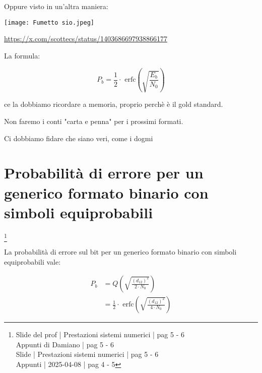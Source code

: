 \newpage 

\begin{tcolorbox}
    Oppure visto in un'altra maniera: \newline 

    \texttt{[image: Fumetto sio.jpeg]} \newline 

    \url{https://x.com/scottecs/status/1403686697938866177} \newline 

    La formula: 

    {
        \Large 
        \begin{equation}
            P_b
            = 
             \frac{1}{2}
        \cdot
        \text{ erfc}
        \left(
            \sqrt{\frac{E_b}{N_0}}
        \right)
        \end{equation}
    }

    ce la dobbiamo ricordare a memoria, proprio perchè è il gold standard.
\end{tcolorbox}

\newpage

\begin{tcolorbox}
    Non faremo i conti "carta e penna" per i prossimi formati. \newline 

    Ci dobbiamo fidare che siano veri, come i dogmi
\end{tcolorbox}

\section{Probabilità di errore per un generico formato binario con simboli equiprobabili}
\footnote{Slide del prof | Prestazioni sistemi numerici | pag 5 - 6\\
Appunti di Damiano | pag 5 - 6  \\
Slide | Prestazioni sistemi numerici | pag 5 - 6 \\
Appunti | 2025-04-08 | pag 4 - 5
}

La probabilità di errore sul bit per un generico formato binario con simboli equiprobabili vale:

{
    \Large
    \begin{equation}
        \begin{split}
            P_b 
            &= 
            Q \left( \sqrt{\frac{(d_{12})^{2}}{2 \cdot N_0}}\right)
            \\
            &= 
            \frac{1}{2}
        \cdot
        \text{ erfc}
        \left(
            \sqrt{\frac{(d_{12})^{2}}{4 \cdot N_0}}
        \right)
        \end{split}
    \end{equation}
}

